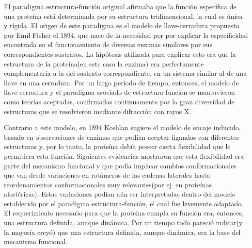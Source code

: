 El paradigma estructura-función original afirmaba que la función específica de una proteína está determinada por su estructura tridimensional, la cual es única y rígida. 
El origen de este paradigma es el modelo de llave-cerradura propuesto por Emil Fisher el 1894, 
que nace de la necesidad por por explicar la especificidad encontrada en el funcionamiento de diversas enzimas similares por sus correspondientes sustratos. 
La hipótesis utilizada para explicar esto era que la estructura de la proteína(en este caso la enzima) era perfectamente complementaria a la del sustrato correspondiente, en un sistema similar al de una llave en una cerradura.
Por un largo período de tiempo, entonces, el modelo de llave-cerradura y el paradigma asociado de estructura-función se mantuvieron como teorías aceptadas, confirmadas continuamente por la
gran diversidad de estructuras que se resolvieron mediante difracción con rayos X. 

Contrario a este modelo, en 1894 Koshlan sugiere el modelo de encaje inducido, basado en observaciones de enzimas que podían aceptar 
ligandos con diferentes estructuras y, por lo tanto, la proteína debía poseer cierta flexibilidad que le permitiera esta función.
Siguientes evidencias mostraron que esta flexibilidad era parte del mecanismo funcional y que podía implicar cambios conformacionales que van desde variaciones en rotámeros de las cadenas laterales hasta 
reordenamientos conformacionales muy relevantes(por ej. en proteínas alostéricas).
Estas variaciones podian aún ser interpretadas dentro del modelo establecido por el paradigma estructura-función, el cual fue levemente adaptado.
El requerimiento necesario para que la proteína cumpla su función era, entonces, una estructura definida, aunque dinámica. 
Por un tiempo todo pareció indicar(y la mayoría creyó) que una estructura definida, aunque dinámica, era la base del mecanismo funcional.

